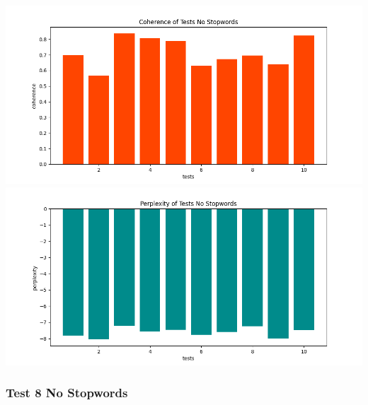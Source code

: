 \documentclass[10pt]{article} %
\begin{document}
	\begin{center}
		\includegraphics[scale=0.6]{images/coherence_no_stopwords}
		\includegraphics[scale=0.6]{images/perplexity_no_stopwords}
	\end{center}

	\subsubsection{Test 8 No Stopwords}
	
\end{document}
